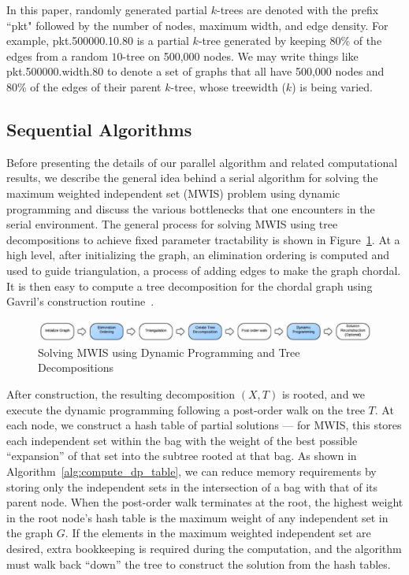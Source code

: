 \documentclass[conference]{IEEEtran}
\begin{document}
In this paper, randomly generated partial $k$-trees are
denoted with the prefix ``pkt" followed
by the number of nodes, maximum width, and edge density. For example,
pkt.500000.10.80 is a partial $k$-tree generated by keeping 80\% of the
edges from a random $10$-tree on 500,000 nodes. We may write things like
pkt.500000.width.80 to denote a set of graphs that all have 500,000 nodes
and 80\% of the edges of their parent $k$-tree, whose treewidth ($k$) is
being varied.

\subsection{Sequential Algorithms}\label{sec:seq_algorithm}

Before presenting the details of our parallel algorithm and related computational results, we describe the general idea behind a serial algorithm for solving the maximum weighted independent set (MWIS) problem using dynamic programming and discuss the various bottlenecks that one encounters in the serial environment. 
The general process for solving MWIS using tree decompositions to achieve fixed parameter tractability is shown in Figure~\ref{fig:sequential.algorithm}.  
At a high level, after initializing the graph, an elimination ordering is computed and used to
guide triangulation, a process of adding edges to make the graph chordal. 
It is then easy to compute a tree decomposition for the chordal graph using Gavril's construction routine~\cite{Gavril1974}.

\begin{figure}[!th]
\includegraphics[scale=0.60]{figures/SequentialAlgorithmDiagram.pdf}
\caption{Solving MWIS using Dynamic Programming and Tree Decompositions}
\label{fig:sequential.algorithm}
\end{figure}

After construction, the resulting decomposition $(X,T)$ is rooted, and we execute the dynamic programming
following a post-order walk on the tree $T$. At each node, we construct a hash table of partial
solutions --- for MWIS, this stores each independent set within the bag with the weight
of the best possible ``expansion'' of that set into the subtree rooted
at that bag. As shown in Algorithm~\ref{alg:compute_dp_table}, we can reduce memory requirements
by storing only the independent sets in the intersection of a bag with that of its parent node. %
When the post-order walk terminates at the root, the highest weight in the root node's hash table is the
maximum weight of any independent set in the graph $G$. If the elements in the maximum
weighted independent set are desired, extra bookkeeping is required during the computation,
and the algorithm must walk back ``down'' the tree to construct the solution from the hash tables.
\end{document}

